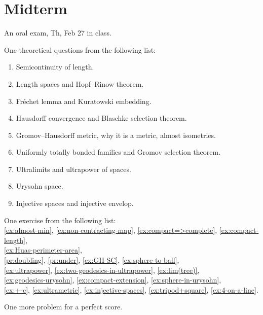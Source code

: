 \chapter{Midterm}\label{chap:midterm}

An oral exam, Th, Feb 27 in class.

\bigskip

\noi 
One theoretical questions from the following list:



\begin{enumerate}



\item 
Semicontinuity of length.



\item
Length spaces and Hopf--Rinow theorem.




\item
Fréchet lemma and Kuratowski embedding.




\item
Hausdorff convergence and Blaschke selection theorem.




\item
Gromov--Hausdorff metric, why it is a metric, almost isometries.




\item
Uniformly totally bonded families and Gromov selection theorem.




\item
Ultralimits and ultrapower of spaces.




\item
Urysohn space.




\item
Injective spaces and injective envelop.
\end{enumerate}

\bigskip

\noi One exercise from the following list:
\\
\ref{ex:almost-min},
\ref{ex:non-contracting-map},
\ref{ex:compact=>complete},
\ref{ex:compact-length},
\\
\ref{ex:Huas-perimeter-area},
\\
\ref{pr:doubling},
\ref{pr:under},
\ref{ex:GH-SC},
\ref{ex:sphere-to-ball},
\\
\ref{ex:ultrapower}, 
\ref{ex:two-geodesics-in-ultrapower},
\ref{ex:lim(tree)},
\\
\ref{ex:geodesics-urysohn},
\ref{ex:compact-extension},
\ref{ex:sphere-in-urysohn},
\\
\ref{ex:+-c},
\ref{ex:ultrametric},
\ref{ex:injective-spaces},
\ref{ex:tripod+square},
\ref{ex:4-on-a-line}.

\bigskip

\noi One more problem for a perfect score.


